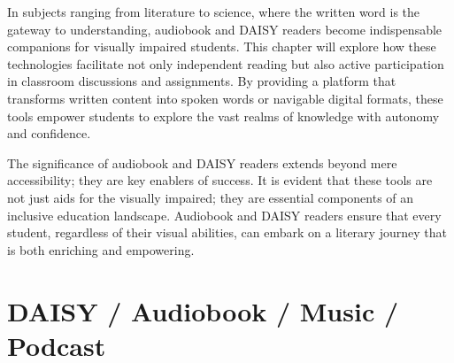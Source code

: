 \documentclass[14pt,letterpaper,twoside]{extreport}
\begin{document}
In subjects ranging from literature to science, where the written word is the gateway to understanding, audiobook and DAISY readers become indispensable companions for visually impaired students. This chapter will explore how these technologies facilitate not only independent reading but also active participation in classroom discussions and assignments. By providing a platform that transforms written content into spoken words or navigable digital formats, these tools empower students to explore the vast realms of knowledge with autonomy and confidence.

The significance of audiobook and DAISY readers extends beyond mere accessibility; they are key enablers of success. It is evident that these tools are not just aids for the visually impaired; they are essential components of an inclusive education landscape. Audiobook and DAISY readers ensure that every student, regardless of their visual abilities, can embark on a literary journey that is both enriching and empowering.

\hypertarget{text-to-speech-music-podcast}{%
	\section{DAISY / Audiobook / Music / Podcast}\label{text-to-speech-music-podcast}}
\end{document}
